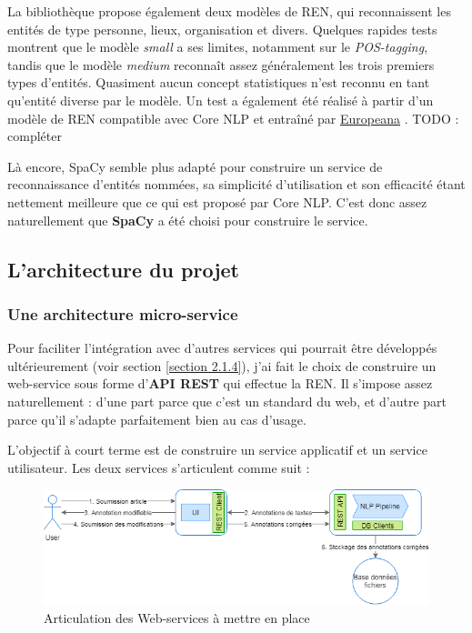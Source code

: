 La bibliothèque propose également deux modèles de REN, qui reconnaissent les entités de type personne, lieux, organisation et divers. Quelques rapides tests montrent que le modèle \textit{small} a ses limites, notamment sur le \textit{POS-tagging}, tandis que le modèle \textit{medium} reconnaît assez généralement les trois premiers types d'entités. Quasiment aucun concept statistiques n'est reconnu en tant qu'entité diverse par le modèle. Un test a également été réalisé à partir d'un modèle de REN compatible avec Core NLP et entraîné par \href{http://lab.kbresearch.nl/static/html/eunews.html}{Europeana} \cite{europeana-ner}. TODO : compléter
\newline

Là encore, SpaCy semble plus adapté pour construire un service de reconnaissance d'entités nommées, sa simplicité d'utilisation et son efficacité étant nettement meilleure que ce qui est proposé par Core NLP. C'est donc assez naturellement que \textbf{SpaCy} a été choisi pour construire le service. 
\label{section 3.1.4}

\subsection{L'architecture du projet}

\subsubsection{Une architecture micro-service}
Pour faciliter l'intégration avec d'autres services qui pourrait être développés ultérieurement (voir section \ref{section 2.1.4}), j'ai fait le choix de construire un web-service sous forme d'\textbf{API REST} qui effectue la REN. Il s'impose assez naturellement : d'une part parce que c'est un standard du web, et d'autre part parce qu'il s'adapte parfaitement bien au cas d'usage.
\newline

L'objectif à court terme est de construire un service applicatif et un service utilisateur. Les deux services s'articulent comme suit :
\vspace{20pt}
\begin{figure}[H]
    \centering
\includegraphics[scale=0.62]{images/Archi-pipeline-web.png}
    \caption{Articulation des Web-services à mettre en place}
    \label{fig:archi-pipeline-web}
\end{figure}

